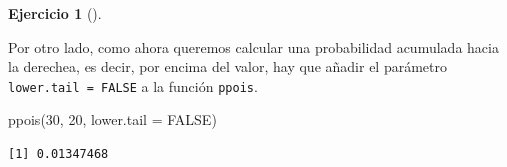 \documentclass[
  a4paper,
]{scrreport}
\newenvironment{Shaded}{\begin{snugshade}}{\end{snugshade}}
\newcommand{\AttributeTok}[1]{\textcolor[rgb]{0.40,0.45,0.13}{#1}}
\newcommand{\ConstantTok}[1]{\textcolor[rgb]{0.56,0.35,0.01}{#1}}
\newcommand{\DecValTok}[1]{\textcolor[rgb]{0.68,0.00,0.00}{#1}}
\newcommand{\FunctionTok}[1]{\textcolor[rgb]{0.28,0.35,0.67}{#1}}
\newcommand{\NormalTok}[1]{\textcolor[rgb]{0.00,0.23,0.31}{#1}}
\theoremstyle{definition}
\newtheorem{exercise}{Ejercicio}[chapter]
\theoremstyle{remark}
\begin{document}
\begin{exercise}[]
\begin{enumerate}
\begin{tcolorbox}
  Por otro lado, como ahora queremos calcular una probabilidad acumulada
  hacia la derechea, es decir, por encima del valor, hay que añadir el
  parámetro \texttt{lower.tail\ =\ FALSE} a la función \texttt{ppois}.

\begin{Shaded}
\begin{Highlighting}[]
\FunctionTok{ppois}\NormalTok{(}\DecValTok{30}\NormalTok{, }\DecValTok{20}\NormalTok{, }\AttributeTok{lower.tail =} \ConstantTok{FALSE}\NormalTok{)}
\end{Highlighting}
\end{Shaded}

\begin{verbatim}
[1] 0.01347468
\end{verbatim}

  \end{tcolorbox}
\end{enumerate}

\end{exercise}
\end{document}
